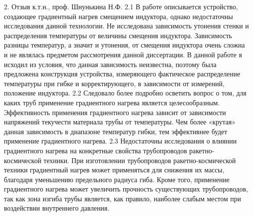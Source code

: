 2. Отзыв к.т.н., проф. Шнунькина Н.Ф.
2.1 В работе описывается устройство, создающее градиентный нагрев смещением индуктора, однако недостаточны исследования данной технологии. Не исследована зависимость утонения стенки и распределения температуры от величины смещения индуктора.
Зависимость разницы температур, а значит и утонения, от смещения индуктора очень сложна и не являлась предметом рассмотрения данной диссертации. В данной работе я исходил из условия, что данная зависимость неизвестна, поэтому была предложена конструкция устройства, измеряющего фактическое распределение температуры при гибке и корректирующего, в зависимости от измерений, положение индуктора.
2.2 Следовало более подробно осветить вопрос о том, для каких труб применение градиентного нагрева является целесообразным.
Эффективность применения градиентного нагрева зависит от зависимости напряжений текучести материала трубы от температуры. Чем более «крутая» данная зависимость в диапазоне температур гибки, тем эффективнее будет применение градиентного нагрева.
2.3 Недостаточны исследования о влиянии градиентного нагрева на конкретные свойства трубопроводов ракетно-космической техники.
При изготовлении трубопроводов ракетно-космической техники градиентный нагрев может применяться для снижения их массы, благодаря уменьшению предельного радиуса гиба. Кроме того, применение градиентного нагрева может увеличить прочность существующих трубопроводов, так как зона изгиба трубы является, как правило, наиболее слабым местом при воздействии внутреннего давления.

